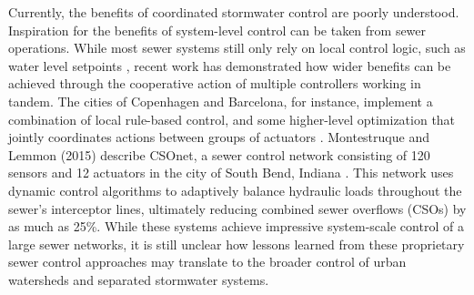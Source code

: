 Currently, the benefits of coordinated stormwater control are poorly understood. Inspiration for the benefits of system-level control can be taken from sewer operations. While most sewer systems still only rely on local control logic, such as water level setpoints \cite{Schutze2004RealToday}, recent work has demonstrated how wider benefits can be achieved through the cooperative action of multiple controllers working in tandem. The cities of Copenhagen and Barcelona, for instance, implement a combination of local rule-based control, and some higher-level optimization that jointly coordinates actions between groups of actuators \cite{Mollerup_2016}. Montestruque and Lemmon (2015) describe CSOnet, a sewer control network consisting of 120 sensors and 12 actuators in the city of South Bend, Indiana \cite{Montestruque_2015}. This network uses dynamic control algorithms to adaptively balance hydraulic loads throughout the sewer’s interceptor lines, ultimately reducing combined sewer overflows (CSOs) by as much as 25\%. While these systems achieve impressive system-scale control of a large sewer networks, it is still unclear how lessons learned from these proprietary sewer control approaches may translate to the broader control of urban watersheds and separated stormwater systems. 

